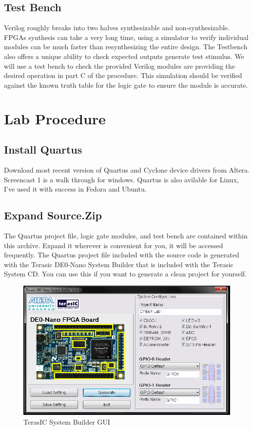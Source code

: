 \documentclass[12pt,journal]{IEEEtran}
\begin{document}
    \subsection{Test Bench}
      Verilog roughly breaks into two halves synthesizable and non-synthesizable. FPGAs synthesis can
      take a very long time, using a simulator to verify individual modules can be much faster than
      resynthesizing the entire design. The Testbench also offers a unique ability to check expected
      outputs generate test stimulus. We will use a test bench to check the provided Verilog modules
      are providing the desired operation in part C of the procedure. This simulation should be verified
      against the known truth table for the logic gate to ensure the module is accurate.

  \section{\bfseries Lab Procedure}
    \subsection{Install Quartus}
    Download most recent version of Quartus and Cyclone device drivers from Altera. Screencast 1
    is a walk through for windows. Quartus is also avilable for Linux, I've used it with success in
    Fedora and Ubuntu.
    
    \subsection{Expand Source.Zip}
    The Quartus project file, logic gate modules, and test bench are contained within this archive. 
    Expand it wherever is convenient for you, it will be accessed frequently. The Quartus project file
    included with the source code is generated with the Terasic DE0-Nano System Builder that is included
    with the Terasic System CD. You can use this if you want to generate a clean project for yourself.
    \begin{figure}[H]
      \includegraphics[width=.48\textwidth]{Images/screenshot_88.jpg}
      \caption{TerasIC System Builder GUI}
    \end{figure}
    
\end{document}
